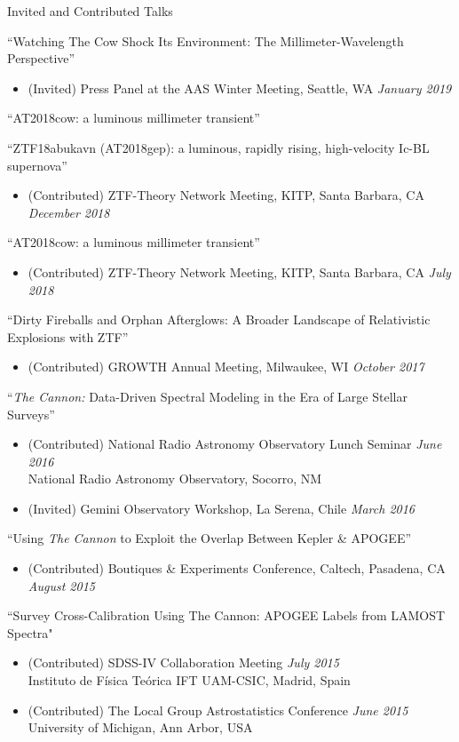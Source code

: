 \documentclass{resume} %
\begin{document}
\begin{rSection}{Invited and Contributed Talks}

``Watching The Cow Shock Its Environment: The Millimeter-Wavelength Perspective''
\begin{itemize}
  \item
    (Invited) Press Panel at the AAS Winter Meeting, Seattle, WA
    \hfill {\em January 2019}
\end{itemize}

``AT2018cow: a luminous millimeter transient''

``ZTF18abukavn (AT2018gep): a luminous, rapidly rising, high-velocity Ic-BL supernova''
\begin{itemize}
  \item
    (Contributed) ZTF-Theory Network Meeting, KITP, Santa Barbara, CA
    \hfill {\em December 2018}
\end{itemize}

``AT2018cow: a luminous millimeter transient''
\begin{itemize}
  \item
    (Contributed) ZTF-Theory Network Meeting, KITP, Santa Barbara, CA
    \hfill {\em July 2018}
\end{itemize}

``Dirty Fireballs and Orphan Afterglows: A Broader Landscape of Relativistic Explosions with ZTF''
\begin{itemize}
  \item
    (Contributed) GROWTH Annual Meeting, Milwaukee, WI
    \hfill {\em October 2017}
\end{itemize}

``\emph{The Cannon:} Data-Driven Spectral Modeling in the Era of Large Stellar Surveys''
\begin{itemize}
  \item
    (Contributed) National Radio Astronomy Observatory Lunch Seminar 
    \hfill {\em June 2016} \\
    National Radio Astronomy Observatory, Socorro, NM
  \item
  (Invited) Gemini Observatory Workshop, La Serena, Chile \hfill {\em March 2016}
\end{itemize}
``Using \emph{The Cannon} to Exploit the Overlap Between Kepler \& APOGEE''
\begin{itemize}
  \item
    (Contributed) Boutiques \& Experiments Conference, Caltech, Pasadena, CA \hfill {\em August 2015}
\end{itemize}
``Survey Cross-Calibration Using The Cannon: APOGEE Labels from LAMOST Spectra"
\begin{itemize}
\item
(Contributed) SDSS-IV Collaboration Meeting \hfill {\em July 2015} \\
Instituto de Física Teórica IFT UAM-CSIC, Madrid, Spain
\item
(Contributed) The Local Group Astrostatistics Conference \hfill {\em June 2015} \\
University of Michigan, Ann Arbor, USA
\end{itemize}


\end{rSection}
\end{document}
